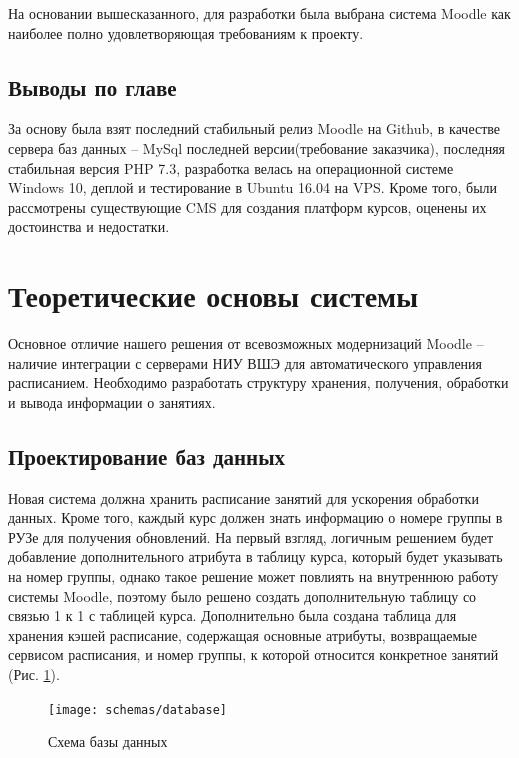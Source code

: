 \documentclass[a4paper,14pt]{article}
\begin{document}
На основании вышесказанного, для разработки была выбрана система Moodle как наиболее полно удовлетворяющая требованиям к проекту.

\subsection{Выводы по главе}

За основу была взят последний стабильный релиз Moodle на Github, в качестве сервера баз данных -- MySql последней версии(требование заказчика), последняя стабильная версия PHP 7.3, разработка велась на операционной системе Windows 10, деплой и тестирование в Ubuntu 16.04 на VPS. 
Кроме того, были рассмотрены существующие CMS для создания платформ курсов, оценены их достоинства и недостатки.


\section{Теоретические основы системы} 

Основное отличие нашего решения от всевозможных модернизаций Moodle -- наличие интеграции с серверами НИУ ВШЭ для автоматического управления расписанием.
Необходимо разработать структуру хранения, получения, обработки и вывода информации о занятиях.

\subsection{Проектирование баз данных}

Новая система должна хранить расписание занятий для ускорения обработки данных.
Кроме того, каждый курс должен знать информацию о номере группы в РУЗе для получения обновлений.
На первый взгляд, логичным решением будет добавление дополнительного атрибута в таблицу курса, который будет указывать на номер группы, однако такое решение может повлиять на внутреннюю работу системы Moodle, поэтому было решено создать дополнительную таблицу со связью 1 к 1 с таблицей курса.
Дополнительно была создана таблица для хранения кэшей расписание, содержащая основные атрибуты, возвращаемые сервисом расписания, и номер группы, к которой относится конкретное занятий (Рис. \ref{img:db_struct}).

\begin{figure}[H]
	\centering		
	\texttt{[image: schemas/database]}
	\caption{Схема базы данных}\label{img:db_struct}
\end{figure}
\end{document}
